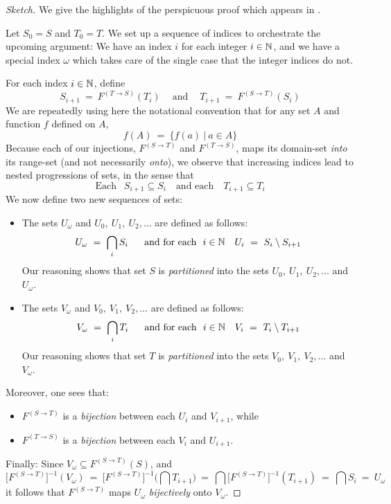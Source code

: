 \begin{proof}[Sketch]
We give the highlights of the perspicuous proof which appears in \cite{Tonien07}.

\smallskip

Let $S_0 = S$ and $T_0 = T$.  We set up a sequence of indices to orchestrate the upcoming argument: We have an index $i$ for each integer $i \in \mathbb{N}$, and we have a special index $\omega$ which takes care of the single case that the integer indices do not.


For each index $i \in \mathbb{N}$, define
\[ S_{i+1} \ = \ F^{(T \rightarrow S)}(T_i) \ \ \ \ \mbox{ and }
\ \ \ \ T_{i+1} \ = \ F^{(S \rightarrow T)}(S_i) 
\]
We are repeatedly using here the notational convention that for any set $A$ and function $f$ defined on $A$,
\[ f(A) \ = \ \{ f(a) \ | \ a \in A \} \]
Because each of our injections, $F^{(S \rightarrow T)}$ and $F^{(T \rightarrow S)}$, maps its domain-set {\em into} its range-set (and not necessarily {\em onto}), we observe that increasing indices lead to nested progressions of sets, in the sense that
\[ \mbox{Each } \ \  S_{i+1} \subseteq S_i
 \ \ \ \mbox{ and each } \ \ \ 
 T_{i+1} \subseteq T_i
\]
We now define two new sequences of sets:
\begin{itemize}
\item
The sets $U_\omega$  and $U_0, \ U_1, \ U_2, \ldots$ are defined as follows:
\[ U_\omega \ = \ \bigcap_i S_i \ \ \ \ \
\mbox{and for each } \  i \in \N \ \ \  U_i \ = \ S_i \setminus S_{i+1} \]
Our reasoning shows that set $S$ is {\em partitioned} into the sets $U_0, \ U_1, \ U_2, \ldots$ and $U_\omega$.
\item
The sets $V_\omega$  and $V_0, \ V_1, \ V_2, \ldots$ are defined as follows:
\[ V_\omega \ = \ \bigcap_i T_i \ \ \ \ \
\mbox{and for each } \  i \in \N \ \ \  V_i \ = \ T_i \setminus T_{i+1}
\]
Our reasoning shows that set $T$ is {\em partitioned} into the sets $V_0, \ V_1, \ V_2, \ldots$ and $V_\omega$.
\end{itemize}
Moreover, one sees that:
\begin{itemize}
\item
$F^{(S \rightarrow T)}$ is a {\em bijection} between each $U_i$ and $V_{i+1}$, while
\item
$F^{(T \rightarrow S)}$ is a {\em bijection} between each $V_i$ and $U_{i+1}$.
\end{itemize}
Finally: Since $V_\omega \subseteq F^{(S \rightarrow T)}(S)$, and
\[ \Big[F^{(S \rightarrow T)}\Big]^{-1} (V_\omega) \ = \
\Big[F^{(S \rightarrow T)}\Big]^{-1} \Big(\bigcap T_{i+1} \Big) \ = \
\bigcap \Big[F^{(S \rightarrow T)}\Big]^{-1} (T_{i+1}) \ = \
\bigcap S_i \ = \ U_\omega
\]
it follows that $F^{(S \rightarrow T)}$ maps $U_\omega$ {\em bijectively} onto $V_\omega$.


\end{proof}
